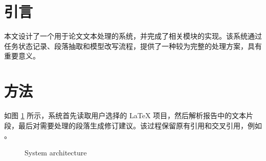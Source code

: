 \documentclass{article}
\begin{document}
\section{引言}
\label{sec:intro}

本文设计了一个用于论文文本处理的系统，并完成了相关模块的实现。该系统通过任务状态记录、段落抽取和模型改写流程，提供了一种较为完整的处理方案，具有重要意义。

\section{方法}
\label{sec:method}

如图 \ref{fig:arch} 所示，系统首先读取用户选择的 LaTeX 项目，然后解析报告中的文本片段，最后对需要处理的段落生成修订建议。该过程保留原有引用和交叉引用，例如 \cite{smith2024}。

\begin{figure}
\centering
{}
\caption{System architecture}
\label{fig:arch}
\end{figure}



\end{document}
